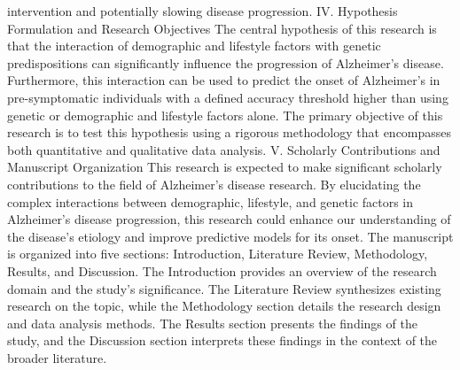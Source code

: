 \documentclass[conference]{IEEEtran}
\begin{document}
intervention and potentially slowing disease progression. IV. Hypothesis Formulation and Research Objectives The central hypothesis of this research is that the interaction of demographic and lifestyle factors with genetic predispositions can significantly influence the progression of Alzheimer's disease. Furthermore, this interaction can be used to predict the onset of Alzheimer's in pre-symptomatic individuals with a defined accuracy threshold higher than using genetic or demographic and lifestyle factors alone. The primary objective of this research is to test this hypothesis using a rigorous methodology that encompasses both quantitative and qualitative data analysis. V. Scholarly Contributions and Manuscript Organization This research is expected to make significant scholarly contributions to the field of Alzheimer's disease research. By elucidating the complex interactions between demographic, lifestyle, and genetic factors in Alzheimer's disease progression, this research could enhance our understanding of the disease's etiology and improve predictive models for its onset. The manuscript is organized into five sections: Introduction, Literature Review, Methodology, Results, and Discussion. The Introduction provides an overview of the research domain and the study's significance. The Literature Review synthesizes existing research on the topic, while the Methodology section details the research design and data analysis methods. The Results section presents the findings of the study, and the Discussion section interprets these findings in the context of the broader literature.
\end{document}
